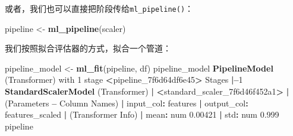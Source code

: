 \documentclass[
]{article}
\newenvironment{Shaded}{\begin{snugshade}}{\end{snugshade}}
\newcommand{\DataTypeTok}[1]{\textcolor[rgb]{0.13,0.29,0.53}{#1}}
\newcommand{\DecValTok}[1]{\textcolor[rgb]{0.00,0.00,0.81}{#1}}
\newcommand{\ErrorTok}[1]{\textcolor[rgb]{0.64,0.00,0.00}{\textbf{#1}}}
\newcommand{\FloatTok}[1]{\textcolor[rgb]{0.00,0.00,0.81}{#1}}
\newcommand{\KeywordTok}[1]{\textcolor[rgb]{0.13,0.29,0.53}{\textbf{#1}}}
\newcommand{\NormalTok}[1]{#1}
\newcommand{\OperatorTok}[1]{\textcolor[rgb]{0.81,0.36,0.00}{\textbf{#1}}}
\newcommand{\OtherTok}[1]{\textcolor[rgb]{0.56,0.35,0.01}{#1}}
\newcommand{\StringTok}[1]{\textcolor[rgb]{0.31,0.60,0.02}{#1}}
\begin{document}
\begin{Shaded}
\end{Shaded}

或者，我们也可以直接把阶段传给\texttt{ml\_pipeline()}：

\begin{Shaded}
\begin{Highlighting}[]
\NormalTok{pipeline <-}\StringTok{ }\KeywordTok{ml_pipeline}\NormalTok{(scaler)}
\end{Highlighting}
\end{Shaded}

我们按照拟合评估器的方式，拟合一个管道：

\begin{Shaded}
\begin{Highlighting}[]
\NormalTok{pipeline_model <-}\StringTok{ }\KeywordTok{ml_fit}\NormalTok{(pipeline, df)}
\NormalTok{pipeline_model}
\KeywordTok{PipelineModel}\NormalTok{ (Transformer) with }\DecValTok{1}\NormalTok{ stage}
\OperatorTok{<}\NormalTok{pipeline_7f6d64df6e45}\OperatorTok{>}
\StringTok{ }\NormalTok{Stages}
 \OperatorTok{|--}\DecValTok{1} \KeywordTok{StandardScalerModel}\NormalTok{ (Transformer)}
 \OperatorTok{|}\StringTok{ }\ErrorTok{<}\NormalTok{standard_scaler_7f6d46f452a1}\OperatorTok{>}
\StringTok{ }\ErrorTok{|}\StringTok{ }\NormalTok{(Parameters }\OperatorTok{--}\StringTok{ }\NormalTok{Column Names)}
 \OperatorTok{|}\StringTok{ }\NormalTok{input_col}\OperatorTok{:}\StringTok{ }\NormalTok{features}
 \OperatorTok{|}\StringTok{ }\NormalTok{output_col}\OperatorTok{:}\StringTok{ }\NormalTok{features_scaled}
 \OperatorTok{|}\StringTok{ }\NormalTok{(Transformer Info)}
 \OperatorTok{|}\StringTok{ }\NormalTok{mean}\OperatorTok{:}\StringTok{ }\NormalTok{num }\FloatTok{0.00421}
 \OperatorTok{|}\StringTok{ }\NormalTok{std}\OperatorTok{:}\StringTok{ }\NormalTok{num }\FloatTok{0.999}
\NormalTok{pipeline}
\end{Highlighting}
\end{Shaded}
\end{document}
